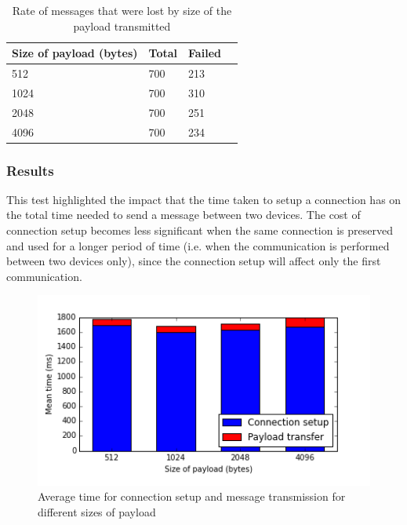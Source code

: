 \begin{table}[h]
\centering
\begin{tabular}{llll}
\hline
Size of payload (bytes) & Total     & Failed    \\ \hline
512                     & 700       & 213       \\
1024                    & 700       & 310       \\
2048                    & 700       & 251       \\
4096                    & 700       & 234       \\
\hline
\end{tabular}
\caption{Rate of messages that were lost by size of the payload transmitted}
\label{table:failure_rate_payload_size}
\end{table}

\subsubsection{Results}
This test highlighted the impact that the time taken to setup a connection has on the total time needed to send a message between two devices.
The cost of connection setup becomes less significant when the same connection is preserved and used for a longer period of time (i.e. when the communication is performed between two devices only), since the connection setup will affect only the first communication.

\begin{figure}[ht!]
  \centering
  \includegraphics[width=1.0\textwidth]{application/img/setup_with_transfer.png}
  \caption{Average time for connection setup and message transmission for different sizes of payload}
  \label{figure:conn_vs_transfer}
\end{figure}

